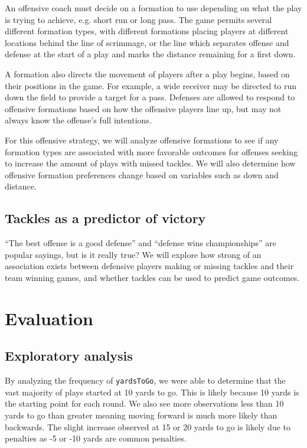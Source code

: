 \documentclass[bibtex, sigconf, hyperref={colorlinks=true,linkcolor=blue,urlcolor=blue}]{acmart}
\begin{document}
An offensive coach must decide on a formation to use depending on what the play
is trying to achieve, e.g. short run or long pass. The game permits several
different formation types, with different formations placing players at
different locations behind the line of scrimmage, or the line which separates
offense and defense at the start of a play and marks the distance remaining for
a first down.

A formation also directs the movement of players after a play begins, based on
their positions in the game. For example, a wide receiver may be directed to run
down the field to provide a target for a pass. Defenses are allowed to respond
to offensive formations based on how the offensive players line up, but may not
always know the offense's full intentions.

For this offensive strategy, we will analyze offensive formations to see if any
formation types are associated with more favorable outcomes for offenses seeking
to increase the amount of plays with missed tackles. We will also determine how
offensive formation preferences change based on variables such as down and
distance.

\subsection{Tackles as a predictor of victory}

“The best offense is a good defense” and “defense wins championships” are
popular sayings, but is it really true? We will explore how strong of an
association exists between defensive players making or missing tackles and
their team winning games, and whether tackles can be used to predict game
outcomes.

\section{Evaluation}

\subsection{Exploratory analysis}

By analyzing the frequency of \verb|yardsToGo|, we were able to determine that
the vast majority of plays started at 10 yards to go. This is likely because
10 yards is the starting point for each round. We also see more observations
less than 10 yards to go than greater meaning moving forward is much more likely
than backwards. The slight increase observed at 15 or 20 yards to go is likely
due to penalties as -5 or -10 yards are common penalties.
\end{document}
